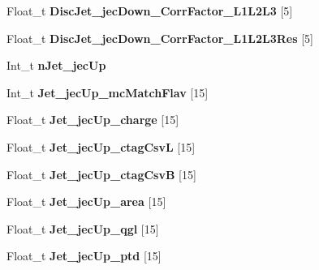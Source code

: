 \begin{DoxyCompactItemize}
\item 
\hypertarget{classMiniTree_a5faded256dc0e523da39bcb6102b58b2}{}\label{classMiniTree_a5faded256dc0e523da39bcb6102b58b2} 
Float\+\_\+t {\bfseries Disc\+Jet\+\_\+jec\+Down\+\_\+\+Corr\+Factor\+\_\+\+L1\+L2\+L3} \mbox{[}5\mbox{]}
\item 
\hypertarget{classMiniTree_a030bf7d8cfa32280dbc0b10ad412d077}{}\label{classMiniTree_a030bf7d8cfa32280dbc0b10ad412d077} 
Float\+\_\+t {\bfseries Disc\+Jet\+\_\+jec\+Down\+\_\+\+Corr\+Factor\+\_\+\+L1\+L2\+L3\+Res} \mbox{[}5\mbox{]}
\item 
\hypertarget{classMiniTree_a7220f503a361538561781f2db2a8f390}{}\label{classMiniTree_a7220f503a361538561781f2db2a8f390} 
Int\+\_\+t {\bfseries n\+Jet\+\_\+jec\+Up}
\item 
\hypertarget{classMiniTree_aa4a30a58e94a95c82dff08063ab90961}{}\label{classMiniTree_aa4a30a58e94a95c82dff08063ab90961} 
Int\+\_\+t {\bfseries Jet\+\_\+jec\+Up\+\_\+mc\+Match\+Flav} \mbox{[}15\mbox{]}
\item 
\hypertarget{classMiniTree_aee94f1ce7fdc4d53bae8b3d99eb02576}{}\label{classMiniTree_aee94f1ce7fdc4d53bae8b3d99eb02576} 
Float\+\_\+t {\bfseries Jet\+\_\+jec\+Up\+\_\+charge} \mbox{[}15\mbox{]}
\item 
\hypertarget{classMiniTree_a993e3678e8e86863e60c2c0bf4979d24}{}\label{classMiniTree_a993e3678e8e86863e60c2c0bf4979d24} 
Float\+\_\+t {\bfseries Jet\+\_\+jec\+Up\+\_\+ctag\+CsvL} \mbox{[}15\mbox{]}
\item 
\hypertarget{classMiniTree_a6446b4cf18315d381c6f9769467f1a36}{}\label{classMiniTree_a6446b4cf18315d381c6f9769467f1a36} 
Float\+\_\+t {\bfseries Jet\+\_\+jec\+Up\+\_\+ctag\+CsvB} \mbox{[}15\mbox{]}
\item 
\hypertarget{classMiniTree_a8fdb2cc370011eb3dd1c65d3e6f11269}{}\label{classMiniTree_a8fdb2cc370011eb3dd1c65d3e6f11269} 
Float\+\_\+t {\bfseries Jet\+\_\+jec\+Up\+\_\+area} \mbox{[}15\mbox{]}
\item 
\hypertarget{classMiniTree_a0e62c8f1c091bc7381123e9a44c78ce8}{}\label{classMiniTree_a0e62c8f1c091bc7381123e9a44c78ce8} 
Float\+\_\+t {\bfseries Jet\+\_\+jec\+Up\+\_\+qgl} \mbox{[}15\mbox{]}
\item 
\hypertarget{classMiniTree_a85ea6351621735d22b5f982407f577b6}{}\label{classMiniTree_a85ea6351621735d22b5f982407f577b6} 
Float\+\_\+t {\bfseries Jet\+\_\+jec\+Up\+\_\+ptd} \mbox{[}15\mbox{]}
\item 
\hypertarget{classMiniTree_a687d8b914fa676577211c2f08c65b540}{}\label{classMiniTree_a687d8b914fa676577211c2f08c65b540} 

\end{DoxyCompactItemize}
